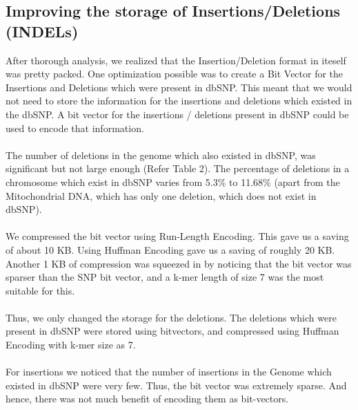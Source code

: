 \documentclass{article}
\begin{document}
\subsection {Improving the storage of Insertions/Deletions (INDELs)}
After thorough analysis, we realized that the Insertion/Deletion format in
iteself was pretty packed. One optimization possible was to create a Bit Vector
for the Insertions and Deletions which were present in dbSNP. This meant that we
would not need to store the information for the insertions and deletions which
existed in the dbSNP. A bit vector for the insertions / deletions present in
dbSNP could be used to encode that information.\\ 
\\
The number of deletions in the genome which also existed in dbSNP, was
significant but not large enough (Refer Table 2). The percentage of deletions in
a chromosome which exist in dbSNP varies from 5.3\% to 11.68\% (apart from the
Mitochondrial DNA, which has only one deletion, which does not exist in
dbSNP).\\
\\
We compressed the bit vector using Run-Length Encoding. This gave us a saving of
about 10 KB. Using Huffman Encoding gave us a saving of roughly 20 KB. Another 1
KB of compression was squeezed in by noticing that the bit vector was sparser
than the SNP bit vector, and a k-mer length of size 7 was the most suitable for
this.\\ 
\\
Thus, we only changed the storage for the deletions. The deletions which were
present in dbSNP were stored using bitvectors, and compressed using Huffman
Encoding with k-mer size as 7.\\
\\
For insertions we noticed that the number of insertions in the Genome which
existed in dbSNP were very few. Thus, the bit vector was extremely sparse. And
hence, there was not much benefit of encoding them as bit-vectors.
\end{document}
